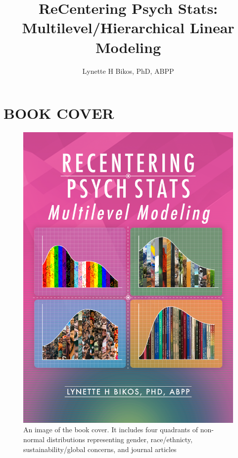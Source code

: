 \documentclass[
  english,
]{book}
\title{ReCentering Psych Stats: Multilevel/Hierarchical Linear Modeling}
\author{Lynette H Bikos, PhD, ABPP}
\date{}
\begin{document}
\maketitle

{
\setcounter{tocdepth}{1}
\tableofcontents
}
\hypertarget{book-cover}{%
\chapter*{BOOK COVER}\label{book-cover}}

\begin{figure}
\centering
\includegraphics{images/ReC_mlevel_bkcvr.png}
\caption{An image of the book cover. It includes four quadrants of non-normal distributions representing gender, race/ethnicty, sustainability/global concerns, and journal articles}
\end{figure}
\end{document}
